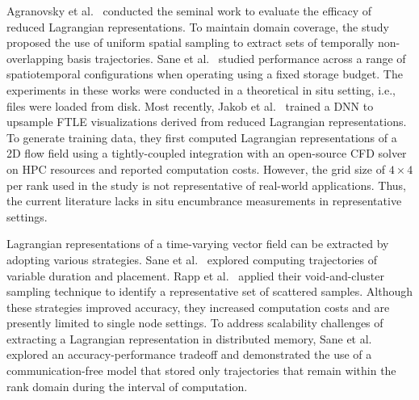 Agranovsky et al.~\cite{agranovsky2014improved} conducted the seminal work to evaluate the efficacy of reduced Lagrangian representations.
%
To maintain domain coverage, the study proposed the use of uniform spatial sampling to extract sets of temporally non-overlapping basis trajectories.
%
Sane et al.~\cite{sane2018revisiting} studied performance across a range of spatiotemporal configurations when operating using a fixed storage budget.
%
%
The experiments in these works were conducted in a theoretical in situ setting, i.e., files were loaded from disk. %
%
%
%
Most recently, Jakob et al.~\cite{Jakob20} trained a DNN to upsample FTLE visualizations derived from reduced Lagrangian representations. 
%
To generate training data, they first computed Lagrangian representations of a 2D flow field using a tightly-coupled integration with an open-source CFD solver on HPC resources and reported computation costs.
%
However, the grid size of $4\times4$ per rank used in the study is not representative of real-world applications.
%
Thus, the current literature lacks in situ encumbrance measurements in representative settings.
%

%
%

Lagrangian representations of a time-varying vector field can be extracted by adopting various strategies.
%
Sane et al.~\cite{sane2019interpolation} explored computing trajectories of variable duration and placement. 
%
Rapp et al.~\cite{rapp2019void} applied their void-and-cluster sampling technique to identify a representative set of scattered samples.
%
Although these strategies improved accuracy, they increased computation costs and are presently limited to single node settings.
%
To address scalability challenges of extracting a Lagrangian representation in distributed memory, Sane et al.~\cite{sane2020scalable} explored an accuracy-performance tradeoff and demonstrated the use of a communication-free model that stored only trajectories that remain within the rank domain during the interval of computation.
%

